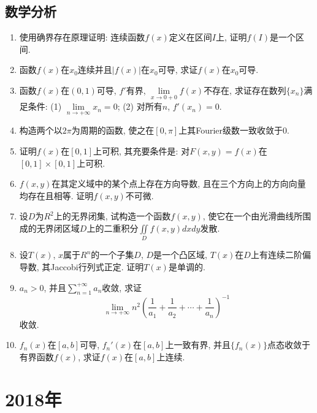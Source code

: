 \documentclass[12pt,a4paper,openany]{book}
\begin{document}
\subsection{数学分析}
\begin{enumerate}
\item 使用确界存在原理证明: 连续函数$f(x)$定义在区间$I$上, 证明$f(I)$是一个区间.

\item 函数$f(x)$在$x_0$连续并且$|f(x)|$在$x_0$可导, 求证$f(x)$在$x_0$可导.

\item 函数$f(x)$在$(0, 1)$可导, $f'$有界, $\lim\limits_{x \rightarrow 0+0}{f(x)}$不存在, 求证存在数列$\{x_n\}$满足条件: (1) $\lim\limits_{n \rightarrow +\infty}{x_n}=0$; (2) 对所有$n$, $f'(x_n) = 0$.

\item 构造两个以$2\pi$为周期的函数, 使之在$[0, \pi]$上其Fourier级数一致收敛于0.

\item 证明$f(x)$在$[0, 1]$上可积, 其充要条件是: 对$F(x, y) = f(x)$在$[0, 1] \times [0, 1]$上可积.

\item $f(x, y)$在其定义域中的某个点上存在方向导数, 且在三个方向上的方向向量均存在且相等. 证明$f(x, y)$不可微.

\item 设$D$为$R^2$上的无界闭集, 试构造一个函数$f(x, y)$, 使它在一个由光滑曲线所围成的无界闭区域$D$上的二重积分$\displaystyle\iint\limits_{D}{f(x, y)dxdy}$发散.

\item 设$T(x)$, $x$属于$R^n$的一个子集$D$, $D$是一个凸区域, $T(x)$在$D$上有连续二阶偏导数, 其Jaccobi行列式正定. 证明$T(x)$是单调的.

\item $a_n > 0$, 并且$\sum\limits_{n=1}^{+\infty}{a_n}$收敛, 求证
\[
\lim_{n \rightarrow +\infty}{n^2(\frac{1}{a_1} + \frac{1}{a_2} + \cdots + \frac{1}{a_n})^{-1}}
\]
收敛.

\item $f_n(x)$在$[a, b]$可导, $f_n'(x)$在$[a, b]$上一致有界, 并且$\{f_n(x)\}$点态收敛于有界函数$f(x)$, 求证$f(x)$在$[a, b]$上连续.
\end{enumerate}

\section{2018年}
\end{document}

